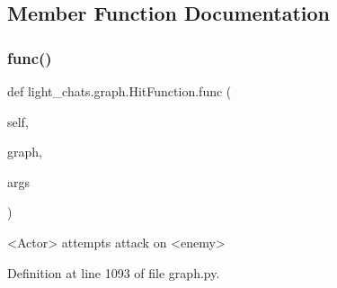 \subsection{Member Function Documentation}
\mbox{\label{classlight__chats_1_1graph_1_1HitFunction_a5154430a7ff1b987446b904c8238eef2}} 
\subsubsection{\texorpdfstring{func()}{func()}}
{\footnotesize\ttfamily def light\+\_\+chats.\+graph.\+Hit\+Function.\+func (\begin{DoxyParamCaption}\item[{}]{self,  }\item[{}]{graph,  }\item[{}]{args }\end{DoxyParamCaption})}

\begin{DoxyVerb}<Actor> attempts attack on <enemy>
\end{DoxyVerb}
 

Definition at line 1093 of file graph.\+py.


